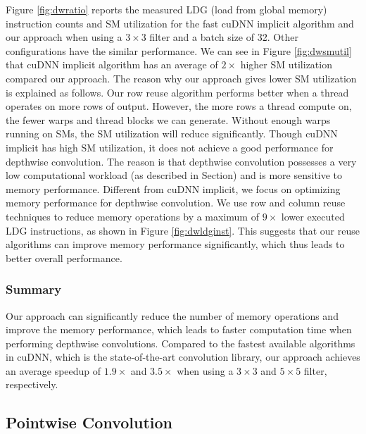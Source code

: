 Figure \ref{fig:dwratio} reports the measured LDG (load from global memory) instruction counts and SM utilization for the fast cuDNN implicit algorithm and our approach when using a $3 \times 3$ filter and a batch size of 32. Other configurations have the similar performance. 
We can see in Figure \ref{fig:dwsmutil} that cuDNN implicit algorithm has an average of $2\times$ higher SM utilization compared our approach.
The reason why our approach gives lower SM utilization is explained as follows. 
Our row reuse algorithm performs better when a thread operates on more rows of output.
However, the more rows a thread compute on, the fewer warps and thread blocks we can generate. Without enough warps running on SMs, the SM utilization will reduce significantly.
Though cuDNN implicit has high SM utilization, it does not achieve a good performance for depthwise convolution. 
The reason is that depthwise convolution possesses a very low computational workload ({\color{red}as described in Section}) and is more sensitive to memory performance.
Different from cuDNN implicit, we focus on optimizing memory performance for depthwise convolution. We use row and column reuse techniques to reduce memory operations by a maximum of $9\times$ lower executed LDG instructions, as shown in Figure \ref{fig:dwldginst}.
This suggests that our reuse algorithms can improve memory performance significantly, which thus leads to better overall performance.

\subsubsection{Summary}
Our approach can significantly reduce the number of memory operations and improve the memory performance, which leads to faster computation time when performing depthwise convolutions.  
Compared to the fastest available algorithms in cuDNN, which is the state-of-the-art convolution library, our approach achieves an average speedup of $1.9\times$ and $3.5\times$ when using a $3 \times 3$ and $5 \times 5$ filter, respectively.


\subsection{Pointwise Convolution}
\label{sec:pwconvexp}


